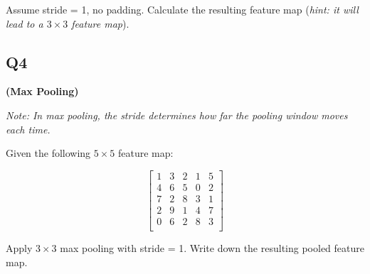 \documentclass[12pt]{article}
\begin{document}
Assume stride = 1, no padding. Calculate the resulting feature map (\textit{hint: it will lead to a $3\times 3$ feature map}).

\vspace{1em}
\subsection*{Q4}
\textbf{(Max Pooling)}

\textit{Note: In max pooling, the stride determines how far the pooling window moves each time.}

Given the following $5 \times 5$ feature map:

\[
\begin{bmatrix}
1 & 3 & 2 & 1 & 5 \\
4 & 6 & 5 & 0 & 2 \\
7 & 2 & 8 & 3 & 1 \\
2 & 9 & 1 & 4 & 7 \\
0 & 6 & 2 & 8 & 3 \\
\end{bmatrix}
\]

Apply $3 \times 3$ max pooling with stride = 1. Write down the resulting pooled feature map.
\end{document}
